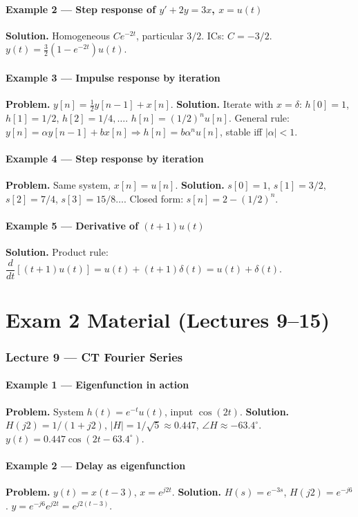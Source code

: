 \documentclass[11pt]{article}
\begin{document}
\subsection{Example 2 --- Step response of $y'+2y=3x$, $x=u(t)$}
\textbf{Solution.} Homogeneous $Ce^{-2t}$, particular $3/2$. ICs: $C=-3/2$. $y(t)=\tfrac32(1-e^{-2t})u(t)$.

\subsection{Example 3 --- Impulse response by iteration}
\textbf{Problem.} $y[n]=\tfrac12 y[n-1]+x[n]$.
\textbf{Solution.} Iterate with $x=\delta$: $h[0]=1$, $h[1]=1/2$, $h[2]=1/4,\ldots$. $h[n]=(1/2)^n u[n]$. General rule: $y[n]=\alpha y[n-1]+bx[n]\Rightarrow h[n]=b\alpha^n u[n]$, stable iff $|\alpha|<1$.

\subsection{Example 4 --- Step response by iteration}
\textbf{Problem.} Same system, $x[n]=u[n]$.
\textbf{Solution.} $s[0]=1$, $s[1]=3/2$, $s[2]=7/4$, $s[3]=15/8\ldots$. Closed form: $s[n]=2-(1/2)^n$.

\subsection{Example 5 --- Derivative of $(t+1)u(t)$}
\textbf{Solution.} Product rule: $\dfrac{d}{dt}[(t+1)u(t)]=u(t)+(t+1)\delta(t)=u(t)+\delta(t)$.

\part{Exam 2 Material (Lectures 9--15)}

\section{Lecture 9 --- CT Fourier Series}

\subsection{Example 1 --- Eigenfunction in action}
\textbf{Problem.} System $h(t)=e^{-t}u(t)$, input $\cos(2t)$.
\textbf{Solution.} $H(j2)=1/(1+j2)$, $|H|=1/\sqrt 5\approx 0.447$, $\angle H\approx -63.4^\circ$.
$y(t)=0.447\cos(2t-63.4^\circ)$.

\subsection{Example 2 --- Delay as eigenfunction}
\textbf{Problem.} $y(t)=x(t-3)$, $x=e^{j2t}$.
\textbf{Solution.} $H(s)=e^{-3s}$, $H(j2)=e^{-j6}$. $y=e^{-j6}e^{j2t}=e^{j2(t-3)}$.
\end{document}
